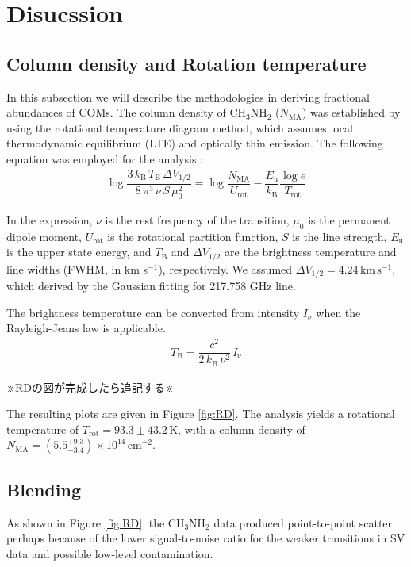 \section{Disucssion}
\subsection{Column density and Rotation temperature}

In this subsection we will describe the methodologies in deriving fractional abundances of COMs.
The column density of CH$_{3}$NH$_{2}$ ($N_{\mathrm{MA}}$) was established by using 
the rotational temperature diagram method, which assumes local thermodynamic equilibrium 
(LTE) and optically thin emission. 
The following equation was employed for the analysis \citep{Turner1991}:
\begin{align}
\log \dfrac{3\,k_{\mathrm{B}}\,T_{\mathrm{B}} \,\Delta V_{1/2}}{8\, \pi^3\, \nu\, S\, \mu_0^2} = \log \dfrac{N_{\mathrm{MA}}}{U_{\mathrm{rot}}} - \dfrac{E_{\mathrm{u}}}{k_{\mathrm{B}}} \dfrac{\log e}{T_{\mathrm{rot}}}
\label{eq:RD}
\end{align}

In the expression, $\nu$ is the rest frequency of the transition, $\mu_0$ is the permanent dipole moment, 
$U_{\mathrm{rot}}$ is the rotational partition function, $S$ is the line strength, 
$E_{\mathrm{u}}$ is the upper state energy, and $ T_{\mathrm{B}}$ and  $\Delta V_{1/2}$ 
are the brightness temperature and line widths (FWHM, in km s$^{-1}$), respectively.
We assumed $\Delta V_{1/2} = 4.24\, \mathrm{km\,s^{-1}}$, which derived by the Gaussian fitting for 
217.758 GHz line.

The brightness temperature can be converted from intensity $I_{\mathrm{\nu}}$
when the Rayleigh-Jeans law is applicable.
\begin{align}
T_{\mathrm{B}} = \dfrac{c^2}{2\,k_{\mathrm{B}}\, \nu^2} \,I_{\mathrm{\nu}}
\end{align}

※RDの図が完成したら追記する※

The resulting plots are given in Figure \ref{fig:RD}.
The analysis yields a rotational temperature of $T_{\mathrm{rot}} =  93.3 \pm 43.2 \,\mathrm{K}$, 
with a column density of $N_{\mathrm{MA}} = ( 5.5^{+9.3}_{-3.4} ) \times 10^{14} \,\mathrm{cm^{-2}}$.

\subsection{Blending}
As shown in Figure \ref{fig:RD}, the CH$_{3}$NH$_{2}$ data produced point-to-point scatter  
perhaps because of the lower signal-to-noise ratio for the weaker transitions in SV data and 
possible low-level contamination.